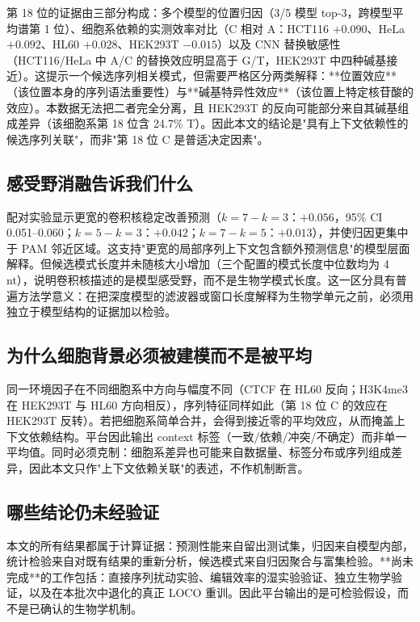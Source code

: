 第 18 位的证据由三部分构成：多个模型的位置归因（3/5 模型 top-3，跨模型平均谱第 1 位）、细胞系依赖的实测效率对比（C 相对 A：HCT116 $+0.090$、HeLa $+0.092$、HL60 $+0.028$、HEK293T $-0.015$）以及 CNN 替换敏感性（HCT116/HeLa 中 A/C 的替换效应明显高于 G/T，HEK293T 中四种碱基接近）。这提示一个候选序列相关模式，但需要严格区分两类解释：**位置效应**（该位置本身的序列语法重要性）与**碱基特异性效应**（该位置上特定核苷酸的效应）。本数据无法把二者完全分离，且 HEK293T 的反向可能部分来自其碱基组成差异（该细胞系第 18 位含 24.7\% T）。因此本文的结论是"具有上下文依赖性的候选序列关联"，而非"第 18 位 C 是普适决定因素"。

\subsection{感受野消融告诉我们什么}

配对实验显示更宽的卷积核稳定改善预测（$k=7-k=3$：$+0.056$，95\% CI 0.051--0.060；$k=5-k=3$：$+0.042$；$k=7-k=5$：$+0.013$），并使归因更集中于 PAM 邻近区域。这支持"更宽的局部序列上下文包含额外预测信息"的模型层面解释。但候选模式长度并未随核大小增加（三个配置的模式长度中位数均为 4\,nt），说明卷积核描述的是模型感受野，而不是生物学模式长度。这一区分具有普遍方法学意义：在把深度模型的滤波器或窗口长度解释为生物学单元之前，必须用独立于模型结构的证据加以检验。

\subsection{为什么细胞背景必须被建模而不是被平均}

同一环境因子在不同细胞系中方向与幅度不同（CTCF 在 HL60 反向；H3K4me3 在 HEK293T 与 HL60 方向相反），序列特征同样如此（第 18 位 C 的效应在 HEK293T 反转）。若把细胞系简单合并，会得到接近零的平均效应，从而掩盖上下文依赖结构。平台因此输出 context 标签（一致/依赖/冲突/不确定）而非单一平均值。同时必须克制：细胞系差异也可能来自数据量、标签分布或序列组成差异，因此本文只作"上下文依赖关联"的表述，不作机制断言。

\subsection{哪些结论仍未经验证}

本文的所有结果都属于计算证据：预测性能来自留出测试集，归因来自模型内部，统计检验来自对既有结果的重新分析，候选模式来自归因聚合与富集检验。**尚未完成**的工作包括：直接序列扰动实验、编辑效率的湿实验验证、独立生物学验证，以及在本批次中退化的真正 LOCO 重训。因此平台输出的是可检验假设，而不是已确认的生物学机制。

